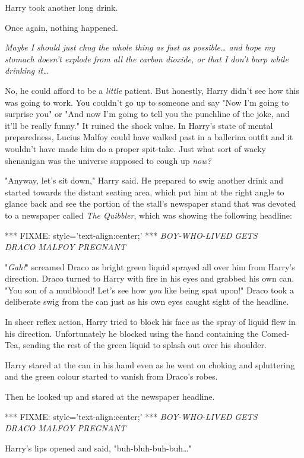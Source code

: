 Harry took another long drink.

Once again, nothing happened.

\emph{Maybe I should just chug the whole thing as fast as possible{\ldots} and 
hope my stomach doesn't explode from all the carbon dioxide, or that I don't 
burp while drinking it{\ldots}}

No, he could afford to be a \emph{little} patient. But honestly, Harry didn't 
see how this was going to work. You couldn't go up to someone and say "Now I'm 
going to surprise you" or "And now I'm going to tell you the punchline of the 
joke, and it'll be really funny." It ruined the shock value. In Harry's state 
of mental preparedness, Lucius Malfoy could have walked past in a ballerina 
outfit and it wouldn't have made him do a proper spit-take. Just what sort of 
wacky shenanigan was the universe supposed to cough up \emph{now?}

"Anyway, let's sit down," Harry said. He prepared to swig another drink and 
started towards the distant seating area, which put him at the right angle to 
glance back and see the portion of the stall's newspaper stand that was devoted 
to a newspaper called \emph{The Quibbler}, which was showing the following 
headline:

*** FIXME: style='text-align:center;' ***
\emph{BOY-WHO-LIVED GETS\\
DRACO MALFOY PREGNANT}

"\emph{Gah!}" screamed Draco as bright green liquid sprayed all over him from 
Harry's direction. Draco turned to Harry with fire in his eyes and grabbed his 
own can. "You son of a mudblood! Let's see how \emph{you} like being spat 
upon!" Draco took a deliberate swig from the can just as his own eyes caught 
sight of the headline.

In sheer reflex action, Harry tried to block his face as the spray of liquid 
flew in his direction. Unfortunately he blocked using the hand containing the 
Comed-Tea, sending the rest of the green liquid to splash out over his shoulder.

Harry stared at the can in his hand even as he went on choking and spluttering 
and the green colour started to vanish from Draco's robes.

Then he looked up and stared at the newspaper headline.

*** FIXME: style='text-align:center;' ***
\emph{BOY-WHO-LIVED GETS\\
DRACO MALFOY PREGNANT}

Harry's lips opened and said, "buh-bluh-buh-buh{\ldots}"

